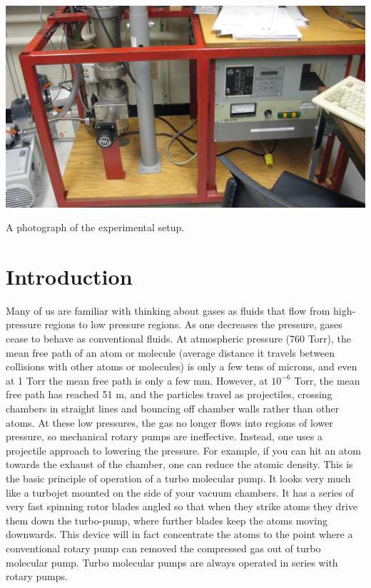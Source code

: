 \begin{marginfigure}
\includegraphics{turbo-pump-system.jpg}
\caption{A photograph of the experimental setup.}
\label{fig:VACsetup8}
\end{marginfigure}

\section{Introduction}

Many of us are familiar with thinking about gases as fluids that flow from high-pressure regions to low pressure regions. As one decreases the pressure, gases cease to behave as conventional fluids. At atmospheric pressure (760 Torr), the mean free path of an atom or molecule (average distance it travels between collisions with other atoms or molecules) is only a few tens of microns, and even at 1 Torr the mean free path is only a few mm. However, at $10^{-6}$ Torr, the mean free path has reached 51 m, and the particles travel as projectiles, crossing chambers in straight lines and bouncing off chamber walls rather than other atoms. At these low pressures, the gas no longer flows into regions of lower pressure, so mechanical rotary pumps are ineffective. Instead, one uses a projectile approach to lowering the pressure. For example, if you can hit an atom towards the exhaust of the chamber, one can reduce the atomic density.  This is the basic principle of operation of a turbo molecular pump. It looks very much like a turbojet mounted on the side of your vacuum chambers. It has a series of very fast spinning rotor blades angled so that when they strike atoms they drive them down the turbo-pump, where further blades keep the atoms moving downwards. This device will in fact concentrate the atoms to the point where a conventional rotary pump can removed the compressed gas out of turbo molecular pump. Turbo molecular pumps are always operated in series with rotary pumps.

